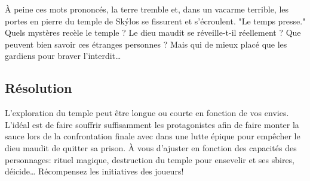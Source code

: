 À peine ces mots prononcés, la terre tremble et, dans un vacarme terrible, les portes en pierre du temple de Skýlos se fissurent et s'écroulent. "Le temps presse." Quels mystères recèle le temple ? Le dieu maudit se réveille-t-il réellement ? Que peuvent bien savoir ces étranges personnes ? Mais qui de mieux placé que les gardiens pour braver l'interdit\dots

\subsection{Résolution}

L'exploration du temple peut être longue ou courte en fonction de vos envies.
L'idéal est de faire souffrir suffisamment les protagonistes afin de faire monter la sauce lors de la confrontation finale avec \skylos dans une lutte épique pour empêcher le dieu maudit de quitter sa prison.
À vous d'ajuster en fonction des capacités des personnages: rituel magique, destruction du temple pour ensevelir \skylos et ses sbires, déicide\dots
Récompensez les initiatives des joueurs!

